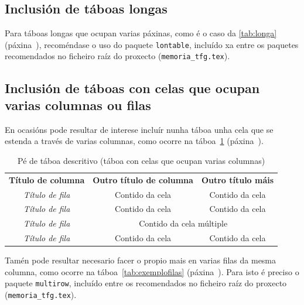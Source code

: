 \subsection{Inclusión de táboas longas}

Para táboas longas que ocupan varias páxinas, como é o caso da \ref{tab:longa}
(páxina~\pageref{tab:longa}), recoméndase o uso do paquete \texttt{lontable},
incluído xa entre os paquetes recomendados no ficheiro raíz do proxecto
(\verb+memoria_tfg.tex+).



\subsection{Inclusión de táboas con celas que ocupan varias columnas ou filas}

En ocasións pode resultar de interese incluír nunha táboa unha cela que se estenda
a través de varias columnas, como ocorre na táboa~\ref{tab:exemplocolumnas}
(páxina~\pageref{tab:exemplocolumnas}).

\begin{table}[hp!]
  \centering
  \begin{tabular}{c|c|c}
  \rowcolor{udcpink!25}
  \multicolumn{3}{c}{\textbf{Cela en varias columnas}} \\\hline
  \rowcolor{udcpink!25}
  \textbf{Título de columna} & \textbf{Outro título de columna} & \textbf{Outro título máis} \\\hline
  \textit{Título de fila}    & Contido da cela                  & Contido da cela \\
  \textit{Título de fila}    & Contido da cela                  & Contido da cela \\
  \textit{Título de fila}    & \multicolumn{2}{c}{Contido da cela múltiple} \\
  \textit{Título de fila}    & Contido da cela                  & Contido da cela \\
  \end{tabular}
  \caption{Pé de táboa descritivo (táboa con celas que ocupan varias columnas)}
  \label{tab:exemplocolumnas}
\end{table}

Tamén pode resultar necesario facer o propio mais en varias filas da mesma columna,
como ocorre na táboa~\ref{tab:exemplofilas} (páxina~\pageref{tab:exemplofilas}).
Para isto é preciso o paquete \texttt{multirow}, incluído entre os recomendados no
ficheiro raíz do proxecto (\verb+memoria_tfg.tex+).

